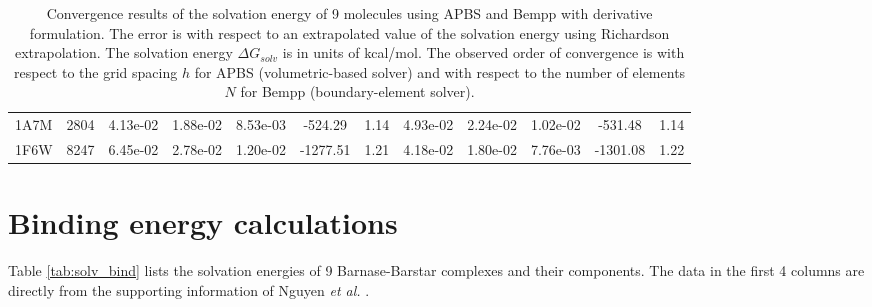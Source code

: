 \documentclass[11pt]{article}
\begin{document}
\begin{landscape}
\begin{table}[]
{\begin{tabular}{cc|ccc|cc|ccc|cc}
    1A7M & 2804 & 4.13e-02 & 1.88e-02 & 8.53e-03 & -524.29                            & 1.14                   & 4.93e-02 & 2.24e-02 & 1.02e-02 & -531.48                            & 1.14                   \\
    1F6W & 8247 & 6.45e-02 & 2.78e-02 & 1.20e-02 & -1277.51                           & 1.21                   & 4.18e-02 & 1.80e-02 & 7.76e-03 & -1301.08                           & 1.22                     
    \end{tabular}
    }
    \caption{Convergence results of the solvation energy of 9 molecules using APBS and Bempp with derivative formulation.
    The error is with respect to an extrapolated value of the solvation energy using Richardson extrapolation.
    The solvation energy $\Delta G_{solv}$ is in units of kcal/mol.
    The observed order of convergence is with respect to the grid spacing $h$ for APBS (volumetric-based solver) and with respect to the number of elements $N$ for Bempp (boundary-element solver).}
    \label{tab:APBS_result}
\end{table}
\end{landscape}

\section*{Binding energy calculations}

Table \ref{tab:solv_bind} lists the solvation energies of 9 Barnase-Barstar complexes and their components.
The data in the first 4 columns are directly from the supporting information of Nguyen \emph{et al.} \cite{nguyenAccurateRobustReliable2017}.
\end{document}
